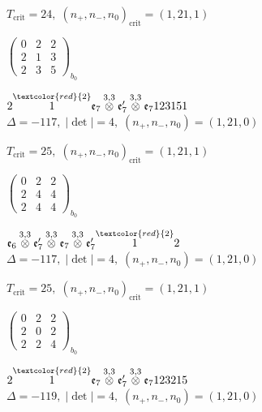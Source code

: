 \documentclass[10pt]{article}
\begin{document}
\hspace{1em}$T_{\text{crit}}=24,\; (n_+,n_-,n_0)_{\text{crit}}=(1,21,1)$

\hspace{2em}$\left(\begin{smallmatrix}0 & 2 & 2 \\ 2 & 1 & 3 \\ 2 & 3 & 5\end{smallmatrix}\right)_{\!b_0}$

\smallskip

$2\overset{\textcolor{red}{2}}{1}\mathfrak{e}_7\overset{3,3}{\otimes}\mathfrak{e}_7'\overset{3,3}{\otimes}\mathfrak{e}_7123151$ \quad $\Delta=-117,\; |\det|=4,\; (n_+,n_-,n_0)=(1,21,0)$

\hspace{1em}$T_{\text{crit}}=25,\; (n_+,n_-,n_0)_{\text{crit}}=(1,21,1)$

\hspace{2em}$\left(\begin{smallmatrix}0 & 2 & 2 \\ 2 & 4 & 4 \\ 2 & 4 & 4\end{smallmatrix}\right)_{\!b_0}$

\smallskip

$\mathfrak{e}_6\overset{3,3}{\otimes}\mathfrak{e}_7'\overset{3,3}{\otimes}\mathfrak{e}_7\overset{3,3}{\otimes}\mathfrak{e}_7'\overset{\textcolor{red}{2}}{1}2$ \quad $\Delta=-117,\; |\det|=4,\; (n_+,n_-,n_0)=(1,21,0)$

\hspace{1em}$T_{\text{crit}}=25,\; (n_+,n_-,n_0)_{\text{crit}}=(1,21,1)$

\hspace{2em}$\left(\begin{smallmatrix}0 & 2 & 2 \\ 2 & 0 & 2 \\ 2 & 2 & 4\end{smallmatrix}\right)_{\!b_0}$

\smallskip

$2\overset{\textcolor{red}{2}}{1}\mathfrak{e}_7\overset{3,3}{\otimes}\mathfrak{e}_7'\overset{3,3}{\otimes}\mathfrak{e}_7123215$ \quad $\Delta=-119,\; |\det|=4,\; (n_+,n_-,n_0)=(1,21,0)$
\end{document}
